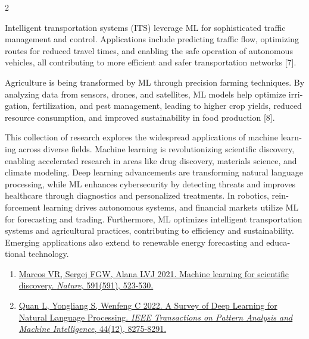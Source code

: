 \documentclass{article}
\begin{document}
\begin{multicols}{2}
\begin{otherlanguage}{english}
Intelligent transportation systems (ITS) leverage ML for sophisticated traffic management and control. Applications include predicting traffic flow, optimizing routes for reduced travel times, and enabling the safe operation of autonomous vehicles, all contributing to more efficient and safer transportation networks [7].

Agriculture is being transformed by ML through precision farming techniques. By analyzing data from sensors, drones, and satellites, ML models help optimize irrigation, fertilization, and pest management, leading to higher crop yields, reduced resource consumption, and improved sustainability in food production [8].
\end{otherlanguage}
\vspace*{2pt}

\par
\vspace*{2pt}
\begin{otherlanguage}{english}
\noindent This collection of research explores the widespread applications of machine learning across diverse fields. Machine learning is revolutionizing scientific discovery, enabling accelerated research in areas like drug discovery, materials science, and climate modeling. Deep learning advancements are transforming natural language processing, while ML enhances cybersecurity by detecting threats and improves healthcare through diagnostics and personalized treatments. In robotics, reinforcement learning drives autonomous systems, and financial markets utilize ML for forecasting and trading. Furthermore, ML optimizes intelligent transportation systems and agricultural practices, contributing to efficiency and sustainability. Emerging applications also extend to renewable energy forecasting and educational technology.
\end{otherlanguage}

\vspace*{6pt}
\vspace*{-7.4pt}
\fontsize{9}{10.5}\selectfont
\begin{enumerate}[label=\textbf{\arabic*.}, leftmargin=12pt, labelwidth=8pt, labelsep=4pt, itemsep=5pt, parsep=0pt]
    \item \href{https://pubmed.ncbi.nlm.nih.gov/33753790/}{Marcos VR, Sergej FGW, Alana LVJ 2021. Machine learning for scientific discovery. \textit{Nature}, 591(591), 523-530.}    \item \href{https://ieeexplore.ieee.org/abstract/document/9530071/}{Quan L, Yongliang S, Wenfeng C 2022. A Survey of Deep Learning for Natural Language Processing. \textit{IEEE Transactions on Pattern Analysis and Machine Intelligence}, 44(12), 8275-8291.}\end{enumerate}

\end{multicols}
\end{document}
